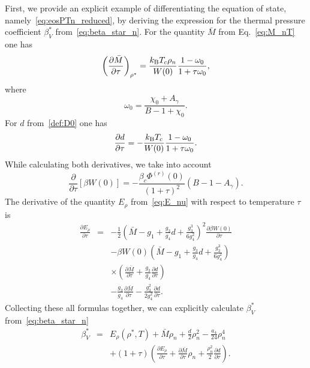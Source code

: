 First, we provide an explicit example of differentiating the equation of state, namely~\eqref{eq:eosPTn_reduced}, by deriving the expression for the thermal pressure coefficient $\beta^*_V$ from~\eqref{eq:beta_star_n}.
For the quantity $\bar{M}$ from Eq.~\eqref{eq:M_nT} one has
\begin{equation}
	\left( \frac{\partial \bar{M}}{\partial \tau} \right)_{\rho^*} =
	\frac{k_{\rm B}T_c \rho_n}{W(0)} \frac{1 - \omega_0}{1 + \tau\omega_0},
\end{equation}
where
\begin{equation*}
	\omega_0 = \frac{\chi_0 + A_{\gamma}}{B - 1 + \chi_0}.
\end{equation*}
For $d$ from~\eqref{def:D0} one has
\begin{equation}
	\frac{\partial d}{\partial \tau} = -\frac{k_{\rm B}T_c}{W(0)} \frac{1 - \omega_0}{1 + \tau \omega_0}.
\end{equation}
While calculating both derivatives, we take into account
\begin{equation}
	\frac{\partial}{\partial \tau} \left[\beta W(0)\right] = -\frac{\beta_c \Phi^{(r)}(0)}{(1+\tau)^2} (B - 1 - A_{\gamma}).
\end{equation}
The derivative of the quantity $E_\rho$ from~\eqref{eq:E_nu} with respect to temperature $\tau$ is
\begin{eqnarray}
	\frac{\partial E_\rho}{\partial \tau} & = &  -\frac{1}{2}\left(\bar{M} - g_1 + \frac{g_3}{g_4} d + \frac{g_3^3}{6g_4^2} \right)^{2} 
	\frac{\partial \beta W(0)}{\partial \tau} 
	\nonumber\\
	&&-\beta W(0)\left(\bar{M} - g_1 + \frac{g_3}{g_4} d + \frac{g_3^3}{6g_4^2} \right)
	\nonumber\\
	&& \times \left(\frac{\partial \bar{M}}{\partial \tau} + \frac{g_3}{g_4}\frac{\partial d}{\partial \tau}\right)
	\nonumber\\
	&& -\frac{g_3}{g_4}\frac{\partial \bar{M}}{\partial \tau} 
	- \frac{g_3^2}{2g_4^2}\frac{\partial d}{\partial \tau}.
\end{eqnarray}
Collecting these all formulas together, we can explicitly calculate $\beta^*_V$ from~\eqref{eq:beta_star_n}
\begin{eqnarray}
	\beta^*_V & = & E_\rho (\rho^*,T) + \bar{M} \rho_{n} + \frac{d}{2} \rho_{n}^2 - \frac{a_4}{24} \rho_{n}^4
	\nonumber\\
	&& + (1+\tau) \left(\frac{\partial E_{\rho}}{\partial \tau} + \frac{\partial \bar{M}}{\partial \tau}\rho_{n} + \frac{\rho_n^2}{2}\frac{\partial d}{\partial \tau}\right).
\end{eqnarray}
